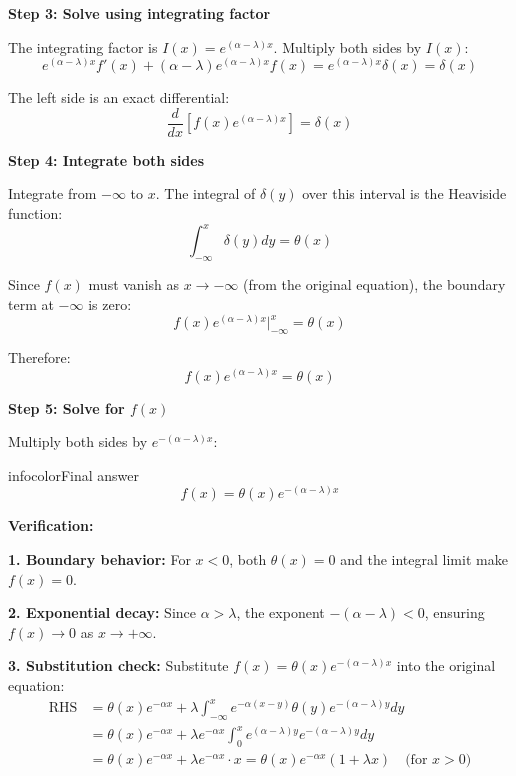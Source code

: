 \documentclass[a4paper,11pt]{article} %
\newenvironment{summarybox}[1][]{\begin{custombox}[#1]{infocolor}{Final answer}}{\end{custombox}}
\begin{document}
\textbf{Step 3: Solve using integrating factor}

The integrating factor is $I(x) = e^{(\alpha-\lambda)x}$. Multiply both sides by $I(x)$:
\begin{equation}
    e^{(\alpha-\lambda)x} f'(x) + (\alpha-\lambda) e^{(\alpha-\lambda)x} f(x) = e^{(\alpha-\lambda)x} \delta(x) = \delta(x)
\end{equation}

The left side is an exact differential:
\begin{equation}
    \frac{d}{dx} \left[ f(x) e^{(\alpha-\lambda)x} \right] = \delta(x)
\end{equation}

\textbf{Step 4: Integrate both sides}

Integrate from $-\infty$ to $x$. The integral of $\delta(y)$ over this interval is the Heaviside function:
\begin{equation}
    \int_{-\infty}^{x} \delta(y) dy = \theta(x)
\end{equation}

Since $f(x)$ must vanish as $x \to -\infty$ (from the original equation), the boundary term at $-\infty$ is zero:
\begin{equation}
    f(x) e^{(\alpha-\lambda)x} \Big|_{-\infty}^{x} = \theta(x)
\end{equation}

Therefore:
\begin{equation}
    f(x) e^{(\alpha-\lambda)x} = \theta(x)
\end{equation}

\textbf{Step 5: Solve for $f(x)$}

Multiply both sides by $e^{-(\alpha-\lambda)x}$:

\begin{summarybox}
$$ f(x) = \theta(x) e^{-(\alpha - \lambda)x} $$
\end{summarybox}

\textbf{Verification:}

\textbf{1. Boundary behavior:} For $x < 0$, both $\theta(x)=0$ and the integral limit make $f(x)=0$. \checkmark

\textbf{2. Exponential decay:} Since $\alpha > \lambda$, the exponent $-(\alpha-\lambda) < 0$, ensuring $f(x) \to 0$ as $x \to +\infty$. \checkmark

\textbf{3. Substitution check:} Substitute $f(x) = \theta(x) e^{-(\alpha-\lambda)x}$ into the original equation:
\begin{align*}
    \text{RHS} &= \theta(x)e^{-\alpha x} + \lambda \int_{-\infty}^{x} e^{-\alpha(x-y)} \theta(y) e^{-(\alpha-\lambda)y} dy \\
    &= \theta(x)e^{-\alpha x} + \lambda e^{-\alpha x} \int_{0}^{x} e^{(\alpha-\lambda)y} e^{-(\alpha-\lambda)y} dy \\
    &= \theta(x)e^{-\alpha x} + \lambda e^{-\alpha x} \cdot x = \theta(x)e^{-\alpha x} \left(1 + \lambda x\right) \quad \text{(for $x>0$)}
\end{align*}
\end{document}
